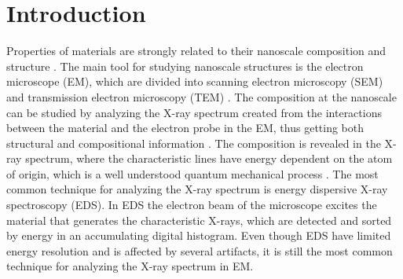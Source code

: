 \chapter{Introduction}
\label{chap:introduction}



%  
%  






Properties of materials are strongly related to their nanoscale composition and structure \cite{callister2014materials}.
The main tool for studying nanoscale structures is the electron microscope (EM), which are divided into scanning electron microscopy (SEM) and transmission electron microscopy (TEM) \cite{goldstein_scanning_2018,williams_carter_tem_2009}.
The composition at the nanoscale can be studied by analyzing the X-ray spectrum created from the interactions between the material and the electron probe in the EM, thus getting both structural and compositional information \cite{jenkins_xrayspectroscopy}.
The composition is revealed in the X-ray spectrum, where the characteristic lines have energy dependent on the atom of origin, which is a well understood quantum mechanical process \cite{hollas_modern_2004,goldstein_scanning_2018}.
The most common technique for analyzing the X-ray spectrum is energy dispersive X-ray spectroscopy (EDS).
In EDS the electron beam of the microscope excites the material that generates the characteristic X-rays, which are detected and sorted by energy in an accumulating digital histogram.
Even though EDS have limited energy resolution and is affected by several artifacts, it is still the most common technique for analyzing the X-ray spectrum in EM.

